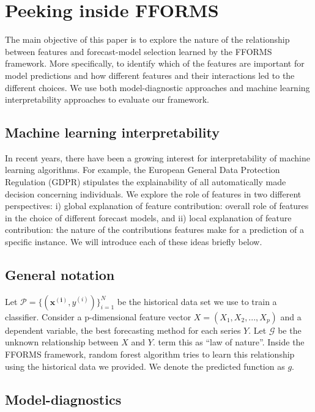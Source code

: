 \documentclass[11pt,a4paper,]{article}
\begin{document}
\section{Peeking inside FFORMS}\label{machinelearning}

The main objective of this paper is to explore the nature of the
relationship between features and forecast-model selection learned by
the FFORMS framework. More specifically, to identify which of the
features are important for model predictions and how different features
and their interactions led to the different choices. We use both
model-diagnostic approaches and machine learning interpretability
approaches to evaluate our framework.

\subsection{Machine learning
interpretability}\label{machine-learning-interpretability}

In recent years, there have been a growing interest for interpretability
of machine learning algorithms. For example, the European General Data
Protection Regulation (GDPR) stipulates the explainability of all
automatically made decision concerning individuals. We explore the role
of features in two different perspectives: i) global explanation of
feature contribution: overall role of features in the choice of
different forecast models, and ii) local explanation of feature
contribution: the nature of the contributions features make for a
prediction of a specific instance. We will introduce each of these ideas
briefly below.

\subsection{General notation}\label{general-notation}

Let \(\mathcal{P}=\{(\mathbf{x^{(i)}}, y^{(i)})\}_{i=1}^{N}\) be the
historical data set we use to train a classifier. Consider a
p-dimensional feature vector \(X=(X_1, X_2, ..., X_p)\) and a dependent
variable, the best forecasting method for each series \(Y\). Let
\(\mathcal{G}\) be the unknown relationship between \(X\) and \(Y\).
\textcite{Zhao} term this as ``law of nature''. Inside the FFORMS
framework, random forest algorithm tries to learn this relationship
using the historical data we provided. We denote the predicted function
as \(g\).

\subsection{Model-diagnostics}\label{model-diagnostics}
\end{document}
